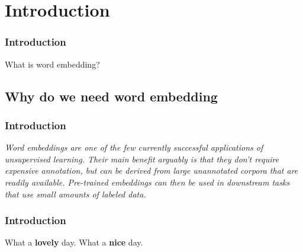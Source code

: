 \section{Introduction}

\begin{frame}
	\frametitle{Introduction}
	
	\begin{center}
		\Huge {What is word embedding?}
	\end{center}
\end{frame}


\subsection{Why do we need word embedding}


\begin{frame}
\frametitle{Introduction}

\begin{center}
	\textit{Word embeddings are one of the few currently successful applications of unsupervised learning. Their main benefit arguably is that they don't require expensive annotation, but can be derived from large unannotated corpora that are readily available. Pre-trained embeddings can then be used in downstream tasks that use small amounts of labeled data.}
\end{center}
\end{frame}



\begin{frame}
\frametitle{Introduction}


\huge {What a \textbf{lovely} day.}
\newline
\huge{What a \textbf{nice} day.}

\end{frame}


